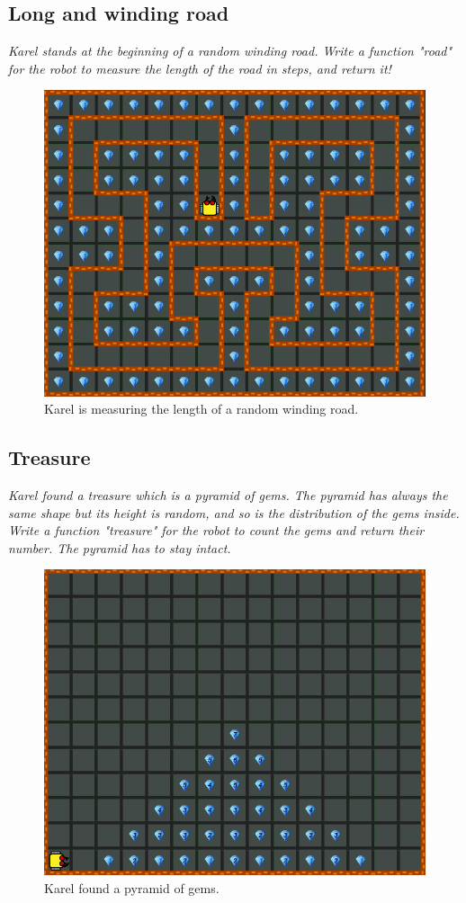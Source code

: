 \subsection{Long and winding road}

{\em Karel stands at the beginning of a random winding road. Write a function "road" for the robot to measure the length of the road in steps, and return it! }\\[-7mm]

\begin{figure}[!ht]
\begin{center}
\includegraphics[height=0.4\textwidth]{img/f14k.png}
\end{center}
\vspace{-4mm}
\caption{Karel is measuring the length of a random winding road.}
\label{fig:f14k}
\vspace{-1cm}
\end{figure}
\newpage

\subsection{Treasure}

{\em Karel found a treasure which is a pyramid of gems. The pyramid has always the same shape but its height is random, and so is the distribution of the gems inside. Write a function "treasure" for the robot to count the gems and return their number. The pyramid has to stay intact.}\\[-9mm]

\begin{figure}[!ht]
\begin{center}
\includegraphics[height=0.4\textwidth]{img/f14m.png}
\end{center}
\vspace{-4mm}
\caption{Karel found a pyramid of gems.}
\label{fig:f14m}
\vspace{-1.2cm}
\end{figure}

